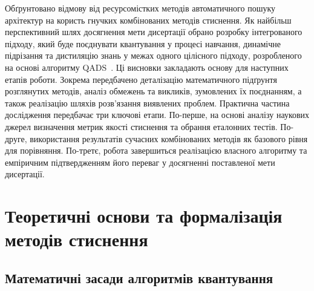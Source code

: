 \documentclass{pma-mthesis}
\begin{document}
Обґрунтовано відмову від ресурсомістких методів автоматичного пошуку архітектур на користь гнучких комбінованих методів стиснення. Як найбільш перспективний шлях досягнення мети дисертації обрано розробку інтегрованого підходу, який буде поєднувати квантування у процесі навчання, динамічне підрізання та дистиляцію знань у межах одного цілісного підходу, розробленого на основі алгоритму QADS~\cite{10946020}. Ці висновки закладають основу для наступних етапів роботи. Зокрема передбачено деталізацію математичного підґрунтя розглянутих методів, аналіз обмежень та викликів, зумовлених їх поєднанням, а також реалізацію шляхів розв’язання виявлених проблем. Практична частина дослідження передбачає три ключові етапи. По-перше, на основі аналізу наукових джерел визначення метрик якості стиснення та обрання еталонних тестів. По-друге, використання результатів сучасних комбінованих методів як базового рівня для порівняння. По-третє, робота завершиться реалізацією власного алгоритму та емпіричним підтвердженням його переваг у досягненні поставленої мети дисертації.

\chapter{Теоретичні основи та формалізація методів стиснення}

\section{Математичні засади алгоритмів квантування}
\end{document}
